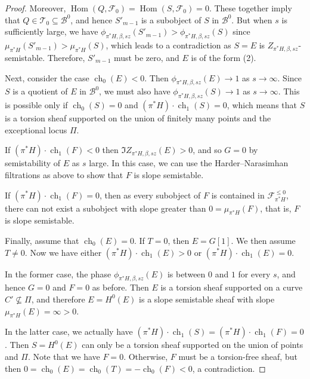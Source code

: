 \documentclass[12pt]{amsart}
\theoremstyle{definition}
\DeclareMathOperator{\Hom}{Hom}
\DeclareMathOperator{\ch}{ch}
\begin{document}
\begin{proof}
Moreover, $\Hom(Q,\mathcal{F}_0) = \Hom(S,\mathcal{F}_0)=0$.
These together imply that $Q \in \mathcal{T}_0 \subseteq \mathcal{B}^0$,
and hence $S'_{m-1}$ is a subobject of $S$ in $\mathcal{B}^0$.
But when $s$ is sufficiently large, 
we have $\phi_{\pi^\ast H,\beta,sz}(S'_{m-1})>\phi_{\pi^\ast H,\beta,sz}(S)$ since $\mu_{\pi^\ast H}(S'_{m-1})>\mu_{\pi^\ast H}(S)$, 
which leads to a contradiction as $S=E$ is $Z_{\pi^\ast H,\beta,sz}$-semistable.
Therefore, $S'_{m-1}$ must be zero, and $E$ is of the form (2).


Next, consider the case $\ch_0(E)<0$.
Then $\phi_{\pi^\ast H,\beta,sz}(E) \rightarrow 1 $ as $s \rightarrow \infty$.
Since $S$ is a quotient of $E$ in $\mathcal{B}^0$,
we must also have $\phi_{\pi^\ast H,\beta,sz}(S) \rightarrow 1 $ as $s \rightarrow \infty$.
This is possible only if $\ch_0
(S) = 0$ and $ (\pi^\ast H) \cdot \ch_1
(S) = 0$, which means that $S$ is a torsion sheaf supported on the union of finitely many points and the exceptional locus $\Pi$.

If $(\pi^\ast H) \cdot \ch_1(F) < 0$ then  $\Im Z_{\pi^\ast H,\beta,sz}(E)>0$, and so  $G = 0 $ by semistability of $E$ as $s$ large.
In this case, we can use the Harder--Narasimhan filtrations as above to show that $F$ is slope semistable.

If $(\pi^\ast H) \cdot  \ch_1(F) = 0$, then as every subobject of $F$ is contained in $\mathcal{F}^{\leq 0}_{\pi^\ast H}$,
there can not exist a subobject with slope greater than $0 = \mu_{\pi^\ast H}(F)$,
that is, $F$ is slope semistable.

Finally, assume that $\ch_0(E)=0$. 
If $T=0$, then $E=G[1]$.
We then assume $T\neq 0$.
Now we have either $(\pi^\ast H) \cdot \ch_1(E) >0$ or $(\pi^\ast H) \cdot \ch_1(E) =0$.

In the former case, the phase $\phi_{\pi^\ast H,\beta,sz}(E)$ is between $0$ and $1$ for every $s$, and hence $G=0$ and $F=0$ as before.
Then $E$ is a torsion sheaf supported on a curve $C' \nsubseteq \Pi$, and therefore $E=H^0(E)$ is a slope semistable sheaf with slope $\mu_{\pi^\ast H}(E)=\infty>0$.

In the latter case, 
we actually have $(\pi^\ast H) \cdot \ch_1(S) =(\pi^\ast H) \cdot \ch_1(F) = 0$.
Then $S=H^0(E)$ can only be a torsion sheaf supported on the union of points and $\Pi$.
Note that we have $F=0$.
Otherwise, $F$ must be a torsion-free sheaf,
but then $0=\ch_0(E)=\ch_0(T)=-\ch_0(F)<0$, a contradiction.
\end{proof}
\end{document}
